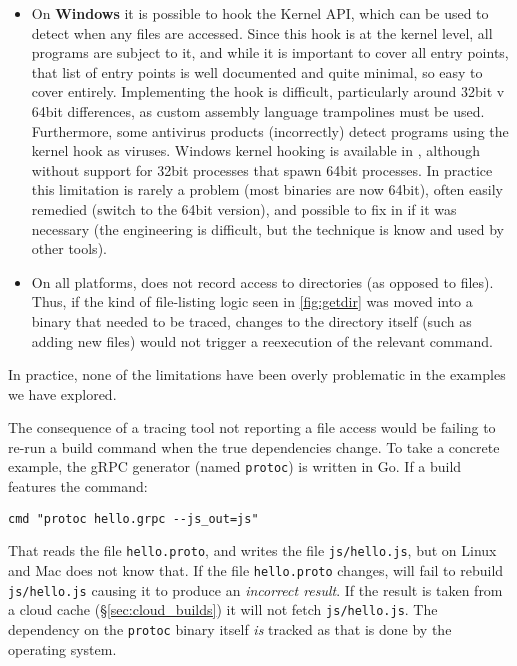 \begin{itemize}
\item On \textbf{Windows} it is possible to hook the Kernel API, which can be used to detect when any files are accessed. Since this hook is at the kernel level, all programs are subject to it, and while it is important to cover all entry points, that list of entry points is well documented and quite minimal, so easy to cover entirely. Implementing the hook is difficult, particularly around 32bit v 64bit differences, as custom assembly language trampolines must be used. Furthermore, some antivirus products (incorrectly) detect programs using the kernel hook as viruses. Windows kernel hooking is available in  \Fsatrace, although without support for 32bit processes that spawn 64bit processes. In practice this limitation is rarely a problem (most binaries are now 64bit), often easily remedied (switch to the 64bit version), and possible to fix in \Fsatrace if it was necessary (the engineering is difficult, but the technique is know and used by other tools).
\item On all platforms, \Fsatrace does not record access to directories (as opposed to files). Thus, if the kind of file-listing logic seen in \ref{fig:getdir} was moved into a binary that needed to be traced, changes to the directory itself (such as adding new files) would not trigger a reexecution of the relevant command.
\end{itemize}

\noindent In practice, none of the limitations have been overly problematic in the examples we have explored.

The consequence of a tracing tool not reporting a file access would be failing to re-run a build command when the true dependencies change. To take a concrete example, the gRPC generator (named \texttt{protoc}) is written in Go. If a \Rattle build features the command:

\begin{verbatim}
cmd "protoc hello.grpc --js_out=js"
\end{verbatim}

That reads the file \texttt{hello.proto}, and writes the file \texttt{js/hello.js}, but on Linux and Mac \Rattle does not know that. If the file \texttt{hello.proto} changes, \Rattle will fail to rebuild \texttt{js/hello.js} causing it to produce an \emph{incorrect result}. If the result is taken from a cloud cache (\S\ref{sec:cloud_builds}) it will not fetch \texttt{js/hello.js}. The dependency on the \texttt{protoc} binary itself \emph{is} tracked as that is done by the operating system.


